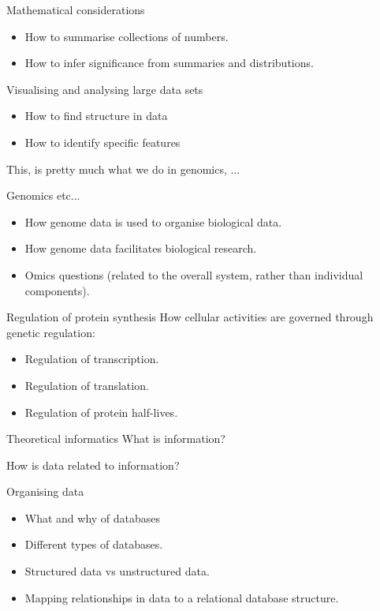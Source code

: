 \documentclass[pdf]{beamer}
\begin{document}
\begin{frame}{Mathematical considerations}
  \begin{itemize}
    \item How to summarise collections of numbers.
    \item How to infer significance from summaries and distributions.
  \end{itemize}
\end{frame}

\begin{frame}{Visualising and analysing large data sets}
  \begin{itemize}
    \item How to find structure in data
    \item How to identify specific features
  \end{itemize}
  This, is pretty much what we do in genomics, ...
\end{frame}

\begin{frame}{Genomics etc...}
  \begin{itemize}
    \item How genome data is used to organise biological data.
    \item How genome data facilitates biological research.
    \item Omics questions (related to the overall system, rather than individual components).
  \end{itemize}
\end{frame}

\begin{frame}{Regulation of protein synthesis}
  How cellular activities are governed through genetic regulation:
  \begin{itemize}
    \item Regulation of transcription.
    \item Regulation of translation.
    \item Regulation of protein half-lives.
  \end{itemize}
\end{frame}

\begin{frame}{Theoretical informatics}
  What is information?

  How is data related to information?
\end{frame}

\begin{frame}{Organising data}
  \begin{itemize}
    \item  What and why of databases
    \item  Different types of databases.
    \item  Structured data vs unstructured data.
    \item  Mapping relationships in data to a relational database structure.
  \end{itemize}
\end{frame}
\end{document}
